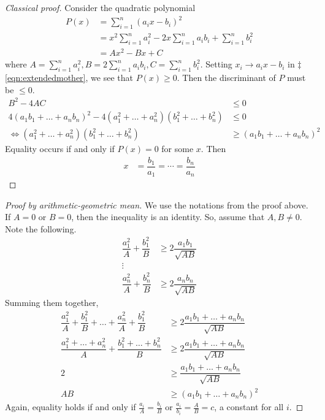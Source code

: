 \documentclass{subfile}
\begin{document}
		\begin{proof}[Classical proof]
			Consider the quadratic polynomial
				\begin{align*}
					P(x)
						& = \sum_{i=1}^n(a_ix-b_i)^2\\
						& = x^2\sum_{i=1}^na_i^2-2x\sum_{i=1}^na_ib_i+\sum_{i=1}^nb_i^2\\
						& = Ax^2-Bx+C
				\end{align*}
			where $A=\sum_{i=1}^na_i^2,B=2\sum_{i=1}^na_ib_i,C=\sum_{i=1}^nb_i^2$. Setting $x_i\to a_ix-b_i$ in \hyperref[eqn:extendedmother]{$\ddagger$\ref{eqn:extendedmother}}, we see that $P(x)\geq0$. Then the discriminant of $P$ must be $\leq0$.
				\begin{align*}
					B^2-4AC
						& \leq0\\
					4(a_1b_1+\ldots+a_nb_n)^2-4(a_1^2+\ldots+a_n^2)(b_1^2+\ldots+b_n^2)
						& \leq0\\
					\iff (a_1^2+\ldots+a_n^2)(b_1^2+\ldots+b_n^2)
						& \geq(a_1b_1+\ldots+a_nb_n)^2
				\end{align*}
			Equality occurs if and only if $P(x)=0$ for some $x$. Then
				\begin{align*}
					x
						& = \dfrac{b_1}{a_1}=\cdots=\dfrac{b_n}{a_n}
				\end{align*}
		\end{proof}
	
		\begin{proof}[Proof by arithmetic-geometric mean]
			We use the notations from the proof above. If $A=0$ or $B=0$, then the inequality is an identity. So, assume that $A,B\neq0$. Note the following.
				\begin{align*}
					\dfrac{a_1^2}{A}+\dfrac{b_1^2}{B}
						& \geq2\dfrac{a_1b_1}{\sqrt{AB}}\\
					\vdots\\
					\dfrac{a_n^2}{A}+\dfrac{b_n^2}{B}
						& \geq2\dfrac{a_nb_n}{\sqrt{AB}}
				\end{align*}
			Summing them together,
				\begin{align*}
					\dfrac{a_1^2}{A}+\dfrac{b_1^2}{B}+\ldots+\dfrac{a_n^2}{A}+\dfrac{b_1^2}{B}
						& \geq2\dfrac{a_1b_1+\ldots+a_nb_n}{\sqrt{AB}}\\
					\dfrac{a_1^2+\ldots+a_n^2}{A}+\dfrac{b_1^2+\ldots+b_n^2}{B}
						& \geq2\dfrac{a_1b_1+\ldots+a_nb_n}{\sqrt{AB}}\\
					2
						& \geq\dfrac{a_1b_1+\ldots+a_nb_n}{\sqrt{AB}}\\
					AB
						& \geq\left(a_1b_1+\ldots+a_nb_n\right)^2
				\end{align*}
			Again, equality holds if and only if $\frac{a_i}{A}=\frac{b_i}{B}$ or $\frac{a_i}{b_i}=\frac{A}{B}=c$, a constant for all $i$.
		\end{proof}
	
\end{document}
